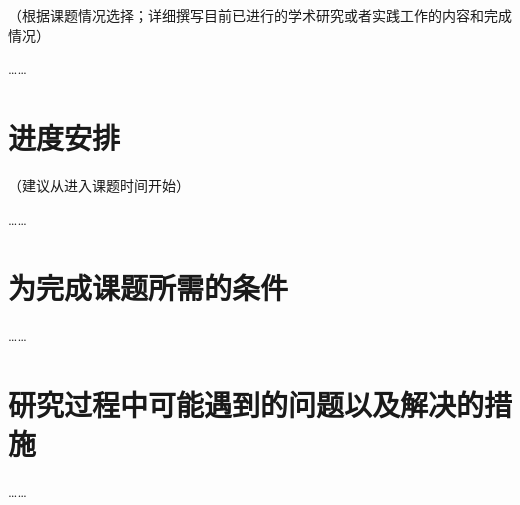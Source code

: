 （根据课题情况选择；详细撰写目前已进行的学术研究或者实践工作的内容和完成情况）

……

\section{进度安排}

（建议从进入课题时间开始）

……

\section{为完成课题所需的条件}

……

\section{研究过程中可能遇到的问题以及解决的措施}

……
